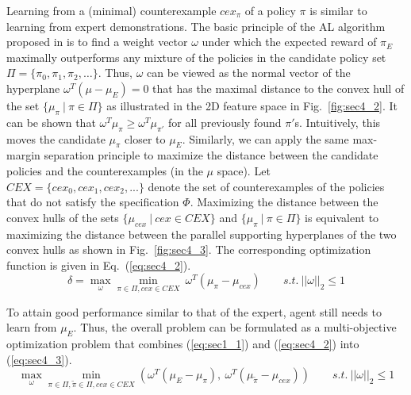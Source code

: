 Learning from a (minimal) counterexample $cex_{\pi}$ of a policy $\pi$ is similar to learning from expert demonstrations. %
The basic principle of the AL algorithm proposed in \cite{Abbeel:2004:ALV:1015330.1015430} is to find a weight vector $\omega$ under which the expected reward of $\pi_E$ maximally outperforms any mixture of the policies in the candidate policy set $\Pi=\{\pi_0, \pi_1, \pi_2, \ldots\}$. Thus, $\omega$ can be viewed as the normal vector of the hyperplane $\omega^T(\mu - \mu_E) = 0$ that has the maximal distance to the convex hull of the set $\{\mu_{\pi}\:|\:\pi\in\Pi\}$ as illustrated in the 2D feature space in Fig.~\ref{fig:sec4_2}. 
It can be shown that $\omega^T \mu_\pi \geq \omega^T \mu_{\pi'}$ for all previously found $\pi'$s. Intuitively, this moves the candidate $\mu_\pi$ closer to $\mu_E$.
Similarly, we can apply the same max-margin separation principle to maximize the distance between the candidate policies and the counterexamples (in the $\mu$ space).     
Let ${CEX}= \{cex_0, cex_1, cex_2, ...\}$ denote the set of counterexamples of the policies that do not satisfy the specification $\Phi$. 
Maximizing the distance between the convex hulls of the sets $\{\mu_{cex}\:|\:cex\in{CEX}\}$ and $\{\mu_{\pi}\:|\:\pi\in\Pi\}$ is equivalent to maximizing the distance between the parallel supporting hyperplanes of the two convex hulls as shown in Fig.~\ref{fig:sec4_3}. The corresponding optimization function is given in Eq.~(\ref{eq:sec4_2}).
\begin{equation}
\delta = \max\limits_{\omega}\min\limits_{\pi\in\Pi, cex\in CEX}\ \omega^T(\mu_{\pi}-\mu_{cex})\label{eq:sec4_2}\qquad s.t.\:||\omega||_2\leq 1
\end{equation}

To attain good performance similar to that of the expert, agent still needs to learn from $\mu_E$. Thus, the overall problem can be formulated as a multi-objective optimization problem that combines (\ref{eq:sec1_1}) and (\ref{eq:sec4_2}) into (\ref{eq:sec4_3}).
\begin{equation}
\max\limits_\omega \min\limits_{\pi \in \Pi, \tilde\pi \in \Pi, cex \in CEX} (\omega^T (\mu_E - \mu_{\pi}),\ \omega^T (\mu_{\tilde\pi} - \mu_{cex}) )\qquad s.t.\:||\omega||_2\leq 1
\label{eq:sec4_3}
\end{equation}

